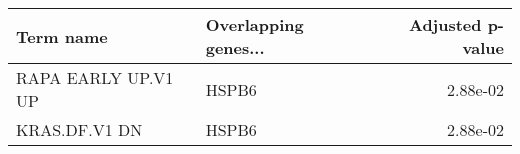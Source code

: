 \begin{tabular}{llr}
\toprule
          Term name & Overlapping genes... &  Adjusted p-value \\
\midrule
RAPA EARLY UP.V1 UP &                HSPB6 &          2.88e-02 \\
      KRAS.DF.V1 DN &                HSPB6 &          2.88e-02 \\
\bottomrule
\end{tabular}
